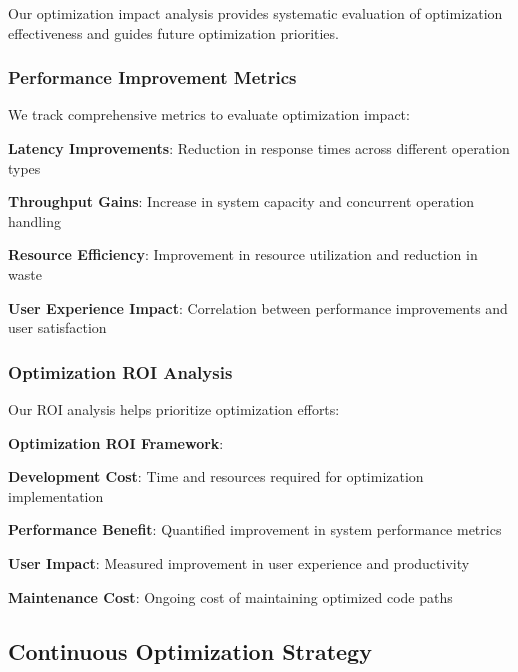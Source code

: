 Our optimization impact analysis provides systematic evaluation of optimization effectiveness and guides future optimization priorities.

\subsubsection*{Performance Improvement Metrics}

We track comprehensive metrics to evaluate optimization impact:

\begin{expandedlist}
    \item \textbf{Latency Improvements}: Reduction in response times across different operation types
    \item \textbf{Throughput Gains}: Increase in system capacity and concurrent operation handling
    \item \textbf{Resource Efficiency}: Improvement in resource utilization and reduction in waste
    \item \textbf{User Experience Impact}: Correlation between performance improvements and user satisfaction
\end{expandedlist}

\subsubsection*{Optimization ROI Analysis}

Our ROI analysis helps prioritize optimization efforts:

\begin{alertbox}
\textbf{Optimization ROI Framework}:
\begin{compactlist}
    \item \textbf{Development Cost}: Time and resources required for optimization implementation
    \item \textbf{Performance Benefit}: Quantified improvement in system performance metrics
    \item \textbf{User Impact}: Measured improvement in user experience and productivity
    \item \textbf{Maintenance Cost}: Ongoing cost of maintaining optimized code paths
\end{compactlist}
\end{alertbox}

\subsection*{Continuous Optimization Strategy}

